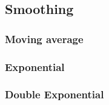 \subsection{Smoothing}

\subsubsection{Moving average}

\subsubsection{Exponential}

\subsubsection{Double Exponential}